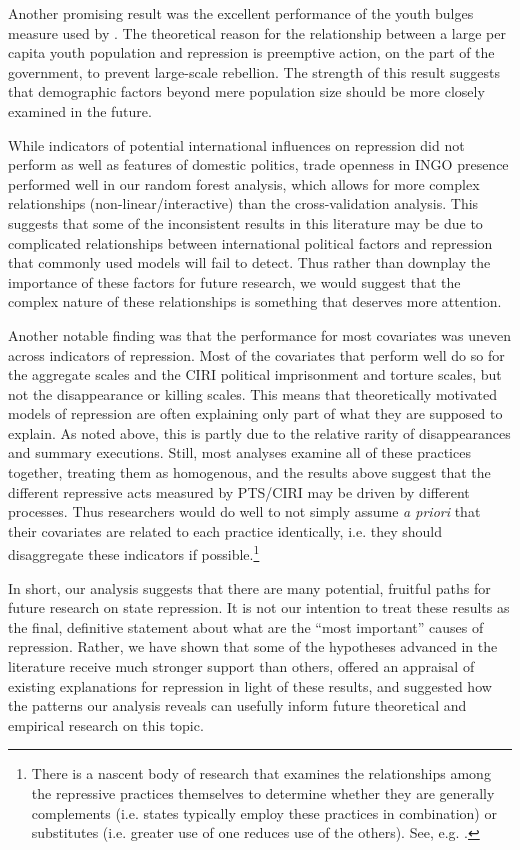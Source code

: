 \documentclass[11pt]{article}
\begin{document}
Another promising result was the excellent performance of the youth bulges measure used by \citet{NordasDavenport2013}. The theoretical reason for the relationship between a large per capita youth population and repression is preemptive action, on the part of the government, to prevent large-scale rebellion. The strength of this result suggests that demographic factors beyond mere population size should be more closely examined in the future. 

While indicators of potential international influences on repression did not perform as well as features of domestic politics, trade openness in INGO presence performed well in our random forest analysis, which allows for more complex relationships (non-linear/interactive) than the cross-validation analysis. This suggests that some of the inconsistent results in this literature may be due to complicated relationships between international political factors and repression that commonly used models will fail to detect. Thus rather than downplay the importance of these factors for future research, we would suggest that the complex nature of these relationships is something that deserves more attention.

Another notable finding was that the performance for most covariates was uneven across indicators of repression. Most of the covariates that perform well do so for the aggregate scales and the CIRI political imprisonment and torture scales, but not the disappearance or killing scales. This means that theoretically motivated models of repression are often explaining only part of what they are supposed to explain. As noted above, this is partly due to the relative rarity of disappearances and summary executions. Still, most analyses examine all of these practices together, treating them as homogenous, and the results above suggest that the different repressive acts measured by PTS/CIRI may be driven by different processes. Thus researchers would do well to not simply assume {\em a priori} that their covariates are related to each practice identically, i.e. they should disaggregate these indicators if possible.\footnote{There is a nascent body of research that examines the relationships among the repressive practices themselves to determine whether they are generally complements (i.e. states typically employ these 
practices in combination) or substitutes (i.e. greater use of one reduces use of the others). See, e.g. \citet{Belletal2013,Demerittetal2014,FarissSchnakenbergJCR}.} 

In short, our analysis suggests that there are many potential, fruitful paths for future research on state repression. It is not our intention to treat these results as the final, definitive statement about what are the ``most important'' causes of repression. Rather, we have shown that some of the hypotheses advanced in the literature receive much stronger support than others, offered an appraisal of existing explanations for repression in light of these results, and suggested how the patterns our analysis reveals can usefully inform future theoretical and empirical research on this topic.  
\end{document}
